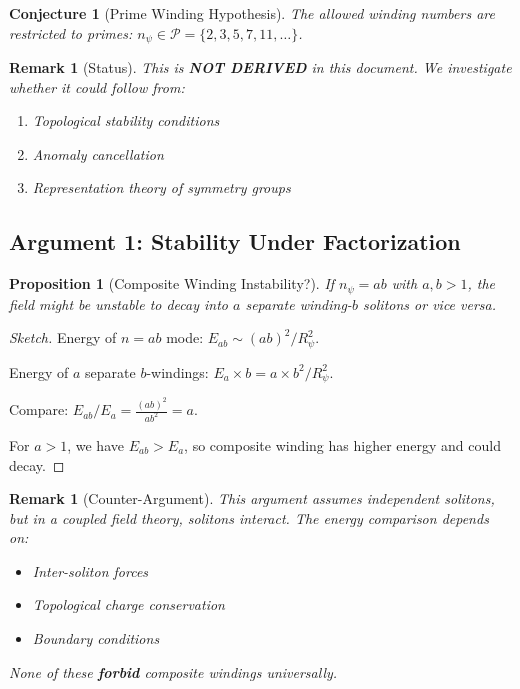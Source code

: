\documentclass[12pt]{article}
\newtheorem{proposition}[definition]{Proposition}
\newtheorem{remark}[definition]{Remark}
\newtheorem{conjecture}{Conjecture}[section]
\begin{document}
\begin{conjecture}[Prime Winding Hypothesis]
The allowed winding numbers are restricted to primes: $n_\psi \in \mathcal{P} = \{2, 3, 5, 7, 11, \ldots\}$.
\end{conjecture}

\begin{remark}[Status]
This is \textbf{NOT DERIVED} in this document. We investigate whether it could follow from:
\begin{enumerate}
    \item Topological stability conditions
    \item Anomaly cancellation
    \item Representation theory of symmetry groups
\end{enumerate}
\end{remark}

\subsection{Argument 1: Stability Under Factorization}

\begin{proposition}[Composite Winding Instability?]
If $n_\psi = ab$ with $a, b > 1$, the field might be unstable to decay into $a$ separate winding-$b$ solitons or vice versa.
\end{proposition}

\begin{proof}[Sketch]
Energy of $n=ab$ mode: $E_{ab} \sim (ab)^2/R_\psi^2$.

Energy of $a$ separate $b$-windings: $E_a \times b = a \times b^2/R_\psi^2$.

Compare: $E_{ab}/E_a = \frac{(ab)^2}{a b^2} = a$.

For $a > 1$, we have $E_{ab} > E_a$, so composite winding has higher energy and could decay.
\end{proof}

\begin{remark}[Counter-Argument]
This argument assumes independent solitons, but in a coupled field theory, solitons interact. The energy comparison depends on:
\begin{itemize}
    \item Inter-soliton forces
    \item Topological charge conservation
    \item Boundary conditions
\end{itemize}
None of these \textbf{forbid} composite windings universally.
\end{remark}
\end{document}
